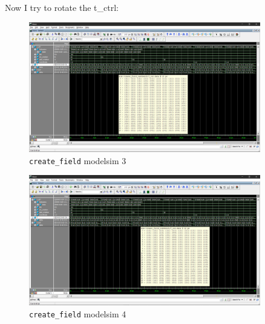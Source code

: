 \documentclass[scale = 0.9]{article}
\newcommand{\code}[1]{\colorbox{light-gray}{\texttt{#1}}} %
\begin{document}
\begin{enumerate}[label=(\alph*)]
        Now I try to rotate the t\_ctrl:
        \begin{figure}[H]
          \begin{center}
            \includegraphics[width=0.9\textwidth]{create_field_3.png}
            \caption{\code{create\_field} modelsim 3}\label{create_field_3}
          \end{center}
        \end{figure}
        \begin{figure}[H]
          \begin{center}
            \includegraphics[width=0.9\textwidth]{create_field_4.png}
            \caption{\code{create\_field} modelsim 4}\label{create_field_4}
          \end{center}
        \end{figure}


\end{enumerate}
\end{document}
